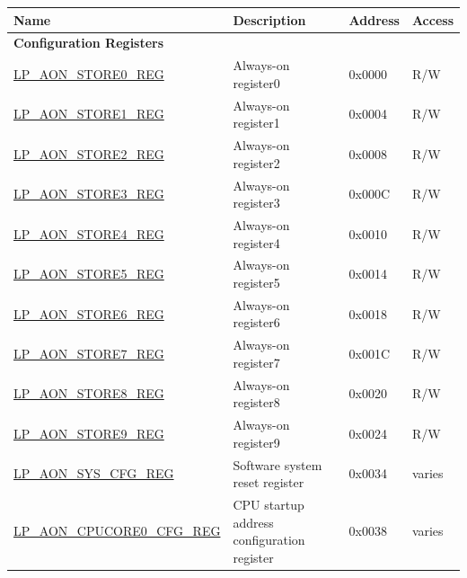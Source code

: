 \begin{longtable}{ | l | p{7cm} | p{1.2cm} | p{1.5cm} | }
\hline\rowcolor{lightgray}
\textbf{Name} & \textbf{Description} &  \textbf{Address} & \textbf{Access} \\ \hline
\endhead
\multicolumn{4}{|l|}{\textbf{Configuration Registers}} \\ \hline
\hyperref[regdesc:LPAONSTORENREG]{LP\_AON\_STORE0\_REG} & Always-on register0 & 0x0000 & R/W \\ \hline
\hyperref[regdesc:LPAONSTORENREG]{LP\_AON\_STORE1\_REG} & Always-on register1 & 0x0004 & R/W \\ \hline
\hyperref[regdesc:LPAONSTORENREG]{LP\_AON\_STORE2\_REG} & Always-on register2 & 0x0008 & R/W \\ \hline
\hyperref[regdesc:LPAONSTORENREG]{LP\_AON\_STORE3\_REG} & Always-on register3 & 0x000C & R/W \\ \hline
\hyperref[regdesc:LPAONSTORENREG]{LP\_AON\_STORE4\_REG} & Always-on register4 & 0x0010 & R/W \\ \hline
\hyperref[regdesc:LPAONSTORENREG]{LP\_AON\_STORE5\_REG} & Always-on register5 & 0x0014 & R/W \\ \hline
\hyperref[regdesc:LPAONSTORENREG]{LP\_AON\_STORE6\_REG} & Always-on register6 & 0x0018 & R/W \\ \hline
\hyperref[regdesc:LPAONSTORENREG]{LP\_AON\_STORE7\_REG} & Always-on register7 & 0x001C & R/W \\ \hline
\hyperref[regdesc:LPAONSTORENREG]{LP\_AON\_STORE8\_REG} & Always-on register8 & 0x0020 & R/W \\ \hline
\hyperref[regdesc:LPAONSTORENREG]{LP\_AON\_STORE9\_REG} & Always-on register9 & 0x0024 & R/W \\ \hline
\hyperref[regdesc:LPAONSYSCFGREG]{LP\_AON\_SYS\_CFG\_REG} & Software system reset register & 0x0034 & varies \\ \hline
\hyperref[regdesc:LPAONCPUCORE0CFGREG]{LP\_AON\_CPUCORE0\_CFG\_REG} & CPU startup address configuration register & 0x0038 & varies \\ \hline
\end{longtable}
